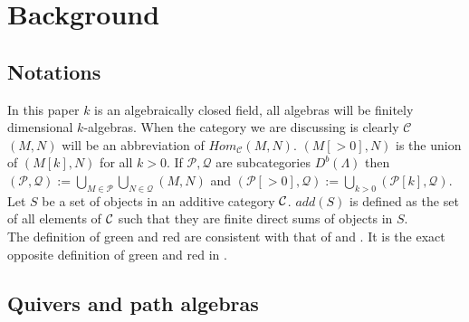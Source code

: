 \chapter{Background}\label{CB}
\section{Notations}
\indent In this paper $k$ is an algebraically closed field, all algebras will be finitely dimensional $k$-algebras. When the category we are discussing is clearly $\mathcal{C}$ $(M,N)$ will be an abbreviation of $Hom_{\mathcal{C}}(M,N)$. $(M[>0],N)$ is the union of $(M[k],N)$ for all $k>0$. If $\mathcal{P}, \mathcal{Q}$ are subcategories $D^b(\Lambda)$ then $(\mathcal{P}, \mathcal{Q}):=\bigcup\limits_{M\in\mathcal{P}}\bigcup\limits_{N\in\mathcal{Q}}(M,N)$ and $(\mathcal{P}[>0], \mathcal{Q}):=\bigcup\limits_{k>0}(\mathcal{P}[k], \mathcal{Q})$. Let $S$ be a set of objects in an additive category $\mathcal{C}$. $add(S)$ is defined as the set of all elements of $\mathcal{C}$ such that they are finite direct sums of objects in $S$.\\
\indent The definition of green and red are consistent with that of \cite{Kel11} and \cite{BDP13}. It is the exact opposite definition of green and red in \cite{BHIT15}.
\section{Quivers and path algebras}
